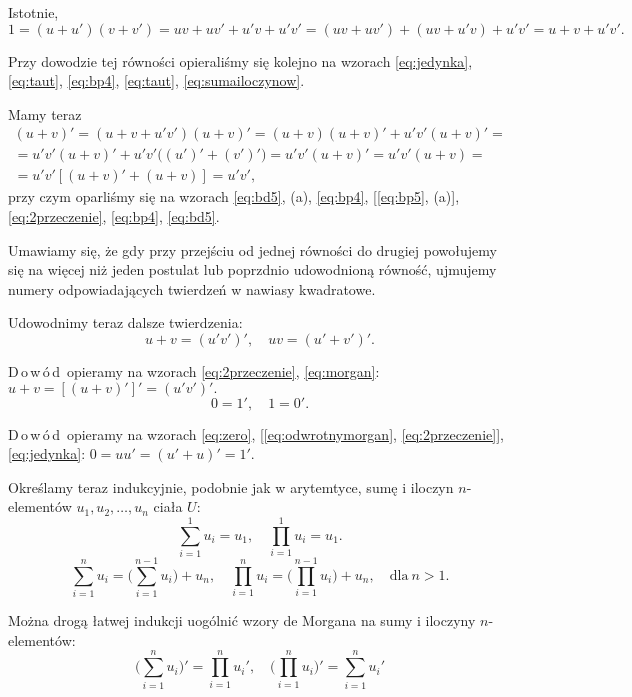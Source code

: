 \documentclass[12 pt, a4paper, leqno]{book}
\numberwithin{equation}{section}
\newcommand{\dowod}{D\,o\,w\,ó\,d}
\theoremstyle{twr}
\theoremstyle{twr}
\theoremstyle{eqtext}
\theoremstyle{okreslenie}
\begin{document}
Istotnie, $1 = (u + u')(v + v') = uv + uv' + u'v + u'v' = (uv + uv') + (uv + u'v) + u'v' = u + v + u'v'.$

Przy dowodzie tej równości opieraliśmy się kolejno na wzorach \eqref{eq:jedynka}, \eqref{eq:taut}, \eqref{eq:bp4}, \eqref{eq:taut}, \eqref{eq:sumailoczynow}.

Mamy teraz
\begin{gather*}
(u + v)' = (u + v + u'v')(u + v)' = (u + v)(u + v)' + u'v'(u + v)' = \\
= u'v'(u + v)' + u'v'\big((u')' + (v')'\big) = u'v'(u + v)' = u'v'(u+v) = \\
= u'v'[(u+v)' + (u + v)] = u'v',
\end{gather*}
przy czym oparliśmy się na wzorach \eqref{eq:bd5}, (a), \eqref{eq:bp4}, [\eqref{eq:bp5}, (a)], \eqref{eq:2przeczenie}, \eqref{eq:bp4}, \eqref{eq:bd5}.

\small{Umawiamy się, że gdy przy przejściu od jednej równości do drugiej powołujemy się na więcej niż jeden postulat lub poprzdnio udowodnioną równość, ujmujemy numery 
odpowiadających twierdzeń w nawiasy kwadratowe.}

\normalsize Udowodnimy teraz dalsze twierdzenia:
\begin{equation} \label{eq:odwrotnymorgan}
u + v = (u'v')', \quad uv = (u' + v')'.
\end{equation}

\dowod\ opieramy na wzorach \eqref{eq:2przeczenie}, \eqref{eq:morgan}: $u + v = [(u + v)']' = (u'v')'.$
\begin{equation} \label{eq:01przeczenia}
0 = 1', \quad 1 = 0'.
\end{equation}

\dowod\ opieramy na wzorach \eqref{eq:zero}, [\eqref{eq:odwrotnymorgan}, \eqref{eq:2przeczenie}], \eqref{eq:jedynka}: $0 = uu' = (u' + u)' = 1'.$

Określamy teraz indukcyjnie, podobnie jak w arytemtyce, sumę i iloczyn $n$-elementów $u_1, u_2, \ldots, u_n$ ciała $U$:
\begin{equation}
  \sum\limits_{i=1}^{1}u_i=u_1,\quad \prod\limits_{i=1}^{1}u_i=u_1.
\end{equation}
\begin{equation}
  \sum\limits_{i=1}^{n}u_i = \big(\!\sum\limits_{i=1}^{n-1}u_i\big) + u_n, \quad \prod\limits_{i=1}^{n}u_i = \big(\!\prod\limits_{i=1}^{n-1}u_i\big) + u_n, \quad \mbox{dla}\ n > 1.
\end{equation}

Można drogą łatwej indukcji uogólnić wzory de Morgana na sumy i iloczyny $n$-elementów:
\begin{equation}
  \big(\!\sum\limits_{i=1}^{n}u_i\big)' = \!\prod\limits_{i=1}^{n}u_i', \quad \big(\!\prod\limits_{i=1}^{n}u_i\big)' = \!\sum\limits_{i=1}^{n}u_i'
\end{equation}
\end{document}

